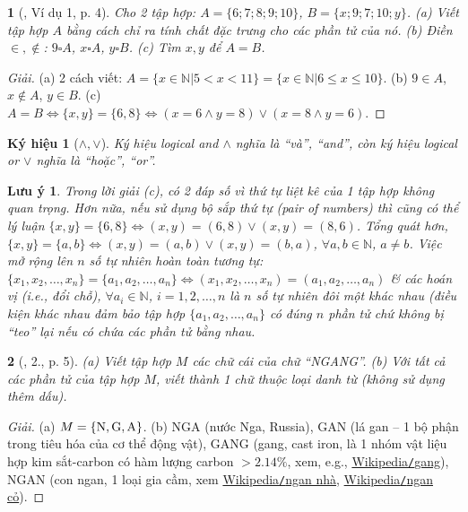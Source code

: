 \documentclass{article}
\newtheorem{baitoan}{}
\newtheorem{kyhieu}{Ký hiệu}
\newtheorem{luuy}{Lưu ý}
\begin{document}
\begin{baitoan}[\cite{Tuyen_Toan_6}, Ví dụ 1, p. 4]
	Cho 2 tập hợp: $A = \{6;7;8;9;10\}$, $B = \{x;9;7;10;y\}$. (a) Viết tập hợp $A$ bằng cách chỉ ra tính chất đặc trưng cho các phần tử của nó. (b) Điền $\in,\notin$: $9\square A$, $x\square A$, $y\square B$. (c) Tìm $x,y$ để $A = B$.
\end{baitoan}

\begin{proof}[Giải]
	(a) 2 cách viết: $A = \{x\in\mathbb{N}|5 < x < 11\} = \{x\in\mathbb{N}|6\le x\le10\}$. (b) $9\in A$, $x\notin A$, $y\in B$. (c) $A = B\Leftrightarrow\{x,y\} = \{6,8\}\Leftrightarrow(x = 6\land y = 8)\lor(x = 8\land y = 6)$.
\end{proof}

\begin{kyhieu}[$\land,\lor$]
	Ký hiệu logical and $\land$ nghĩa là ``và'', ``and'', còn ký hiệu logical or $\lor$ nghĩa là ``hoặc'', ``or''.
\end{kyhieu}

\begin{luuy}
	Trong lời giải (c), có 2 đáp số vì thứ tự liệt kê của 1 tập hợp không quan trọng. Hơn nữa, nếu sử dụng bộ sắp thứ tự (pair of numbers) thì cũng có thể lý luận $\{x,y\} = \{6,8\}\Leftrightarrow(x,y) = (6,8)\lor(x,y) = (8,6)$. Tổng quát hơn, $\{x,y\} = \{a,b\}\Leftrightarrow(x,y) = (a,b)\lor(x,y) = (b,a)$, $\forall a,b\in\mathbb{N}$, $a\ne b$. Việc mở rộng lên $n$ số tự nhiên hoàn toàn tương tự: $\{x_1,x_2,\ldots,x_n\} = \{a_1,a_2,\ldots,a_n\}\Leftrightarrow(x_1,x_2,\ldots,x_n) = (a_1,a_2,\ldots,a_n)$ \& các hoán vị (i.e., đổi chỗ), $\forall a_i\in\mathbb{N}$, $i = 1,2,\ldots,n$ là $n$ số tự nhiên đôi một khác nhau (điều kiện khác nhau đảm bảo tập hợp $\{a_1,a_2,\ldots,a_n\}$ có đúng $n$ phần tử chứ không bị ``teo'' lại nếu có chứa các phần tử bằng nhau.
\end{luuy}

\begin{baitoan}[\cite{Tuyen_Toan_6}, 2., p. 5]
	(a) Viết tập hợp $M$ các chữ cái của chữ {\rm``NGANG''}. (b) Với tất cả các phần tử của tập hợp $M$, viết thành 1 chữ thuộc loại danh từ (không sử dụng thêm dấu).
\end{baitoan}

\begin{proof}[Giải]
	(a) $M = \{{\rm N,G,A}\}$. (b) NGA (nước Nga, Russia), GAN (lá gan -- 1 bộ phận trong tiêu hóa của cơ thể động vật), GANG (gang, cast iron, là 1 nhóm vật liệu hợp kim sắt-carbon có hàm lượng carbon $> 2.14\%$, xem, e.g., \href{https://vi.wikipedia.org/wiki/Gang}{Wikipedia{\tt/}gang}), NGAN (con ngan, 1 loại gia cầm, xem \href{https://vi.wikipedia.org/wiki/Ngan_nh%C3%A0}{Wikipedia{\tt/}ngan nhà}, \href{https://vi.wikipedia.org/wiki/Ngan_c%E1%BB%8F}{Wikipedia{\tt/}ngan cỏ}).
\end{proof}
\end{document}
